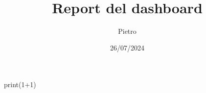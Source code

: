 \documentclass{report}
\title{Report del dashboard}
\date{26/07/2024}
\author{Pietro}
\begin{document}


\begin{Schunk}
\begin{Sinput}
print(1+1)
\end{Sinput}
\begin{Soutput}

\end{Soutput}
\end{Schunk}
\end{document}
